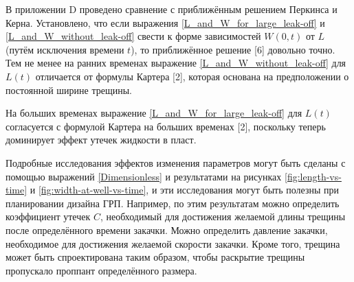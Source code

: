 \documentclass[a4paper, 11pt]{article}
\begin{document}
В приложении D проведено сравнение с приближённым решением Перкинса и Керна.
Установлено, что если выражения \eqref{L_and_W_for_large_leak-off} и \eqref{L_and_W_without_leak-off} свести к форме зависимостей $W(0,t)$ от $L$ (путём исключения времени $t$), то приближённое решение [6] довольно точно.
Тем не менее на ранних временах выражение \eqref{L_and_W_without_leak-off} для $L(t)$ отличается от формулы Картера [2], которая основана на предположении о постоянной ширине трещины.

На больших временах выражение \eqref{L_and_W_for_large_leak-off} для $L(t)$ согласуется с формулой Картера на больших временах [2], поскольку теперь доминирует эффект утечек жидкости в пласт.

Подробные исследования эффектов изменения параметров могут быть сделаны с помощью выражений \eqref{Dimensionless} и результатами на рисунках \ref{fig:length-vs-time} и \ref{fig:width-at-well-vs-time}, и эти исследования могут быть полезны при планировании дизайна ГРП.
Например, по этим результатам можно определить коэффициент утечек $C$, необходимый для достижения желаемой длины трещины после определённого времени закачки.
Можно определить давление закачки, необходимое для достижения желаемой скорости закачки.
Кроме того, трещина может быть спроектирована таким образом, чтобы раскрытие трещины пропускало проппант определённого размера.
\end{document}
